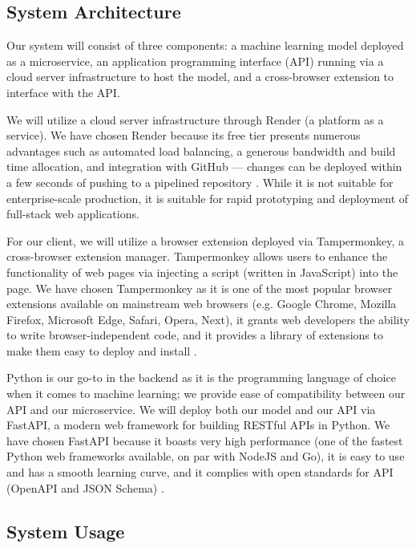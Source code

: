 \subsection{System Architecture}

Our system will consist of three components: a machine learning model deployed as a microservice, an application programming interface (API) running via a cloud server infrastructure to host the model, and a cross-browser extension to interface with the API.

We will utilize a cloud server infrastructure through Render (a platform as a service). We have chosen Render because its free tier presents numerous advantages such as automated load balancing, a generous bandwidth and build time allocation, and integration with GitHub — changes can be deployed within a few seconds of pushing to a pipelined repository \cite{render-docs}. While it is not suitable for enterprise-scale production, it is suitable for rapid prototyping and deployment of full-stack web applications.

For our client, we will utilize a browser extension deployed via Tampermonkey, a cross-browser extension manager. Tampermonkey allows users to enhance the functionality of web pages via injecting a script (written in JavaScript) into the page. We have chosen Tampermonkey as it is one of the most popular browser extensions available on mainstream web browsers (e.g. Google Chrome, Mozilla Firefox, Microsoft Edge, Safari, Opera, Next), it grants web developers the ability to write browser-independent code, and it provides a library of extensions to make them easy to deploy and install \cite{tampermonkey-website}.

Python is our go-to in the backend as it is the programming language of choice when it comes to machine learning; we provide ease of compatibility between our API and our microservice. We will deploy both our model and our API via FastAPI, a modern web framework for building RESTful APIs in Python. We have chosen FastAPI because it boasts very high performance (one of the fastest Python web frameworks available, on par with NodeJS and Go), it is easy to use and has a smooth learning curve, and it complies with open standards for API (OpenAPI and JSON Schema) \cite{fastapi-website}.

\subsection{System Usage}

